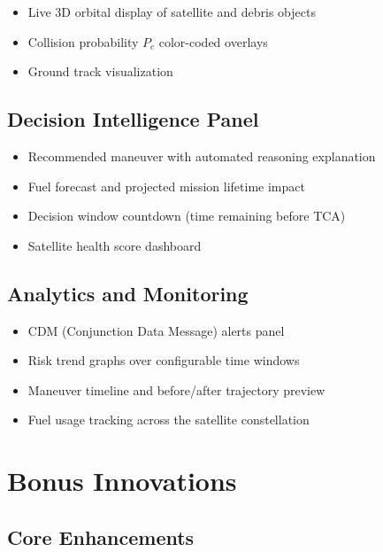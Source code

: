 \documentclass[11pt, a4paper]{article}
\begin{document}
\begin{itemize}[leftmargin=1.5cm]
  \item Live 3D orbital display of satellite and debris objects
  \item Collision probability $P_c$ color-coded overlays
  \item Ground track visualization
\end{itemize}

\subsection{Decision Intelligence Panel}

\begin{itemize}[leftmargin=1.5cm]
  \item Recommended maneuver with automated reasoning explanation
  \item Fuel forecast and projected mission lifetime impact
  \item Decision window countdown (time remaining before TCA)
  \item Satellite health score dashboard
\end{itemize}

\subsection{Analytics and Monitoring}

\begin{itemize}[leftmargin=1.5cm]
  \item CDM (Conjunction Data Message) alerts panel
  \item Risk trend graphs over configurable time windows
  \item Maneuver timeline and before/after trajectory preview
  \item Fuel usage tracking across the satellite constellation
\end{itemize}

\section{Bonus Innovations}

\subsection{Core Enhancements}
\end{document}
